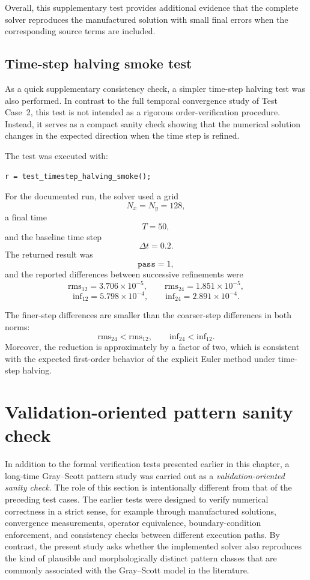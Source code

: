 Overall, this supplementary test provides additional evidence that the complete solver reproduces the manufactured solution with small final errors when the corresponding source terms are included.

\subsection{Time-step halving smoke test}
\label{sec:verification_timestep_halving_smoke}

As a quick supplementary consistency check, a simpler time-step halving test was also performed. In contrast to the full temporal convergence study of Test Case~2, this test is not intended as a rigorous order-verification procedure. Instead, it serves as a compact sanity check showing that the numerical solution changes in the expected direction when the time step is refined.

The test was executed with:
\begin{verbatim}
r = test_timestep_halving_smoke();
\end{verbatim}

For the documented run, the solver used a grid
\[
N_x=N_y=128,
\]
a final time
\[
T=50,
\]
and the baseline time step
\[
\Delta t = 0.2.
\]
The returned result was
\[
\texttt{pass} = 1,
\]
and the reported differences between successive refinements were
\[
\mathrm{rms}_{12} = 3.706\times 10^{-5}, \qquad
\mathrm{rms}_{24} = 1.851\times 10^{-5},
\]
\[
\mathrm{inf}_{12} = 5.798\times 10^{-4}, \qquad
\mathrm{inf}_{24} = 2.891\times 10^{-4}.
\]

The finer-step differences are smaller than the coarser-step differences in both norms:
\[
\mathrm{rms}_{24} < \mathrm{rms}_{12},
\qquad
\mathrm{inf}_{24} < \mathrm{inf}_{12}.
\]
Moreover, the reduction is approximately by a factor of two, which is consistent with the expected first-order behavior of the explicit Euler method under time-step halving.


\section{Validation-oriented pattern sanity check}
\label{sec:verification_pattern_sanity}

In addition to the formal verification tests presented earlier in this chapter, a long-time Gray--Scott pattern study was carried out as a \emph{validation-oriented sanity check}. The role of this section is intentionally different from that of the preceding test cases. The earlier tests were designed to verify numerical correctness in a strict sense, for example through manufactured solutions, convergence measurements, operator equivalence, boundary-condition enforcement, and consistency checks between different execution paths. By contrast, the present study asks whether the implemented solver also reproduces the kind of plausible and morphologically distinct pattern classes that are commonly associated with the Gray--Scott model in the literature.

